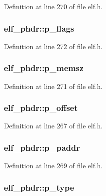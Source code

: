 Definition at line 270 of file elf.h.
\subsubsection[{p\_\-flags}]{ {\bf elf\_\-phdr::p\_\-flags}}\label{structelf__phdr_fa2e2034e7daf2695d04eaf8375e7796}




Definition at line 272 of file elf.h.
\subsubsection[{p\_\-memsz}]{ {\bf elf\_\-phdr::p\_\-memsz}}\label{structelf__phdr_09277064cd7b1cd5e088c617968733b8}




Definition at line 271 of file elf.h.
\subsubsection[{p\_\-offset}]{ {\bf elf\_\-phdr::p\_\-offset}}\label{structelf__phdr_78074c28e263b59ddd1c16ae41fe6219}




Definition at line 267 of file elf.h.
\subsubsection[{p\_\-paddr}]{ {\bf elf\_\-phdr::p\_\-paddr}}\label{structelf__phdr_d080bf22e93b1a97c8ae146ad22868fd}




Definition at line 269 of file elf.h.
\subsubsection[{p\_\-type}]{ {\bf elf\_\-phdr::p\_\-type}}\label{structelf__phdr_8b6d1410f0e52fc3bad1c2dc9b6c1ee2}




